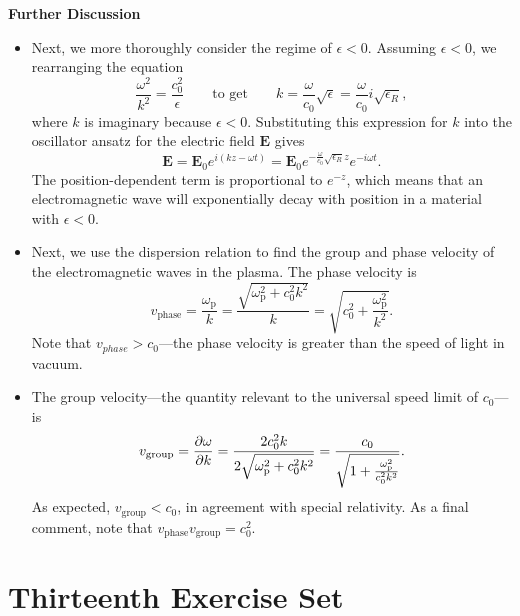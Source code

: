 \documentclass[11pt, a4paper]{article}
\newcommand{\eqtext}[1]{\qquad \text{#1} \qquad}
\renewcommand{\vec}[1]{\bm{#1}} %
\newcommand{\E}{\vec{E}}  %
\newcommand{\e}{\epsilon}
\begin{document}
\textbf{Further Discussion}	
\begin{itemize}
	
	\item Next, we more thoroughly consider the regime of $ \e < 0 $. Assuming $ \e < 0 $, we rearranging the equation 
	\begin{equation*}
		\frac{\omega^{2}}{k^{2}} = \frac{c_{0}^{2}}{\e} \eqtext{to get} k = \frac{\omega}{c_{0}}\sqrt{\e}  = \frac{\omega}{c_{0}}i \sqrt{\e_{R}},
	\end{equation*}
	where $ k $ is imaginary because $ \e < 0 $. Substituting this expression for $ k $ into the oscillator ansatz for the electric field $ \E $ gives
	\begin{equation*}
		\E = \E_{0} e^{i(kz - \omega t)} = \E_{0}e^{-\frac{\omega}{c_{0}}\sqrt{\e_{R}}z}e^{-i\omega t}.
	\end{equation*}
	The position-dependent term is proportional to $ e^{-z} $, which means that an electromagnetic wave will exponentially decay with position in a material with $ \e < 0 $. 
	
	\item Next, we use the dispersion relation to find the group and phase velocity of the electromagnetic waves in the plasma. The phase velocity is 
	\begin{equation*}
		v_{\text{phase}} = \frac{\omega_{\mathrm{p}}}{k} = \frac{\sqrt{\omega_{\mathrm{p}}^{2} + c_{0}^{2}k^{2}}}{k} = \sqrt{c_{0}^{2} + \frac{\omega_{\mathrm{p}}^{2}}{k^{2}}}.
	\end{equation*}
	Note that $ v_{phase} > c_{0} $---the phase velocity is greater than the speed of light in vacuum. 
	
	\item The group velocity---the quantity relevant to the universal speed limit of $ c_{0} $---is 
	\begin{equation*}
		v_{\mathrm{group}} = \pdv{\omega}{k} = \frac{2 c_{0}^{2}k}{2 \sqrt{\omega_{\mathrm{p}}^{2} + c_{0}^{2}k^{2}}} = \frac{c_{0}}{\sqrt{1 + \frac{\omega_{\mathrm{p}}^{2}}{c_{0}^{2}k^{2}}}}.
	\end{equation*}
	As expected, $ v_{\mathrm{group}} < c_{0} $, in agreement with special relativity. As a final comment, note that $ v_{\mathrm{phase}}v_{\mathrm{group}} = c_{0}^{2} $.
\end{itemize}

\newpage
\section{Thirteenth Exercise Set}
\end{document}
